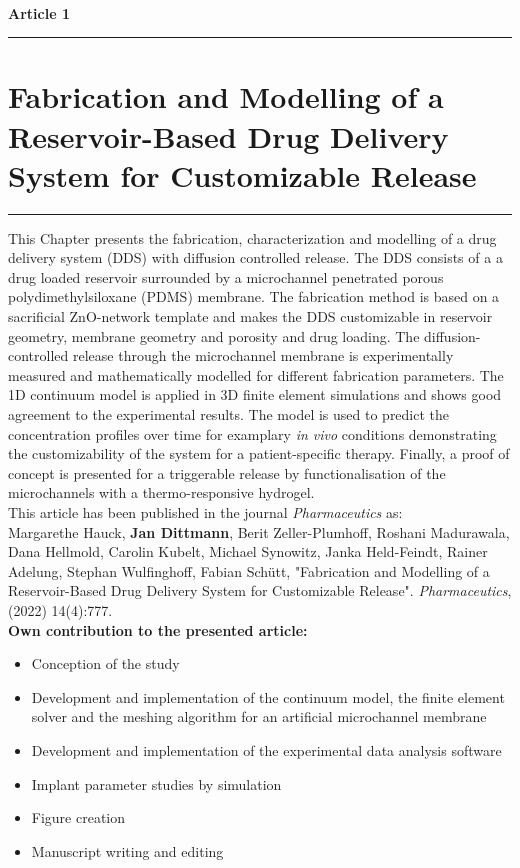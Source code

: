 \ \vspace{1cm} \\
\Large {\bf Article 1}
\normalsize
\vspace{0.3cm}
\hrule
\section*{\Large \centering Fabrication and Modelling of a Reservoir-Based Drug Delivery
System for Customizable Release}
\vspace{0.3cm}
\hrule
\vspace{1.5cm}

This Chapter presents the fabrication, characterization and modelling of a drug delivery system (DDS) with diffusion controlled release. The DDS consists of a a drug loaded reservoir surrounded by a microchannel penetrated porous polydimethylsiloxane (PDMS) membrane. The fabrication method is based on a sacrificial ZnO-network template and makes the DDS customizable in reservoir geometry, membrane geometry and porosity and drug loading. The diffusion-controlled release through the microchannel membrane is experimentally measured and mathematically modelled for different fabrication parameters. The 1D continuum model is applied in 3D finite element simulations and shows good agreement to the experimental results. The model is used to predict the concentration profiles over time for examplary \textit{in vivo} conditions demonstrating the customizability of the system for a patient-specific therapy. Finally, a proof of concept is presented for a triggerable release by functionalisation of the microchannels with a thermo-responsive hydrogel. \\

This article has been published in the journal \textit{Pharmaceutics} as: \vspace{0.3cm} \\ 
{\small Margarethe Hauck, \textbf{Jan Dittmann}, Berit Zeller-Plumhoff, Roshani Madurawala, Dana Hellmold, Carolin Kubelt, Michael Synowitz, Janka Held-Feindt, Rainer Adelung, Stephan Wulfinghoff, Fabian Schütt, "Fabrication and Modelling of a Reservoir-Based Drug Delivery System for Customizable Release". \textit{Pharmaceutics}, (2022) 14(4):777.}\\ 

\textbf{Own contribution to the presented article:}
\begin{itemize}
\item Conception of the study
\item Development and implementation of the continuum model, the finite element solver and the meshing algorithm for an artificial microchannel membrane
\item Development and implementation of the experimental data analysis software 
\item Implant parameter studies by simulation  
\item Figure creation 
\item Manuscript writing and editing
\end{itemize}

